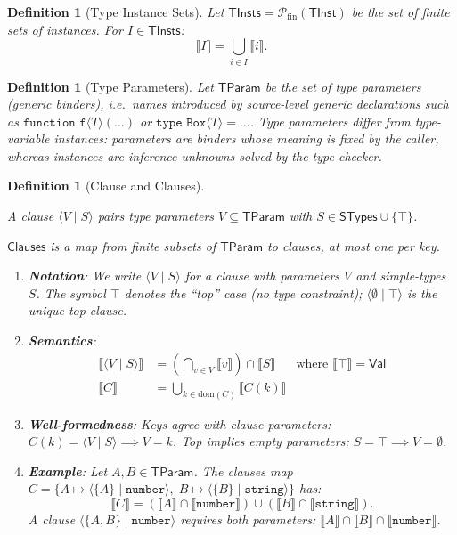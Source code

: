 \documentclass[11pt]{article}
\newtheorem{definition}[theorem]{Definition}
\newcommand{\sem}[1]{\llbracket #1 \rrbracket}
\newcommand{\Clauses}{\mathsf{Clauses}}
\newcommand{\STypes}{\mathsf{STypes}}
\newcommand{\TInst}{\mathsf{TInst}}
\newcommand{\TInsts}{\mathsf{TInsts}}
\newcommand{\TParam}{\mathsf{TParam}}
\newcommand{\Val}{\mathsf{Val}}
\newcommand{\clause}[2]{\langle #1 \mid #2 \rangle}
\begin{document}
\begin{definition}[Type Instance Sets]
\label{def:type-instance-sets}
Let $\TInsts = \mathcal{P}_{\mathrm{fin}}(\TInst)$ be the set of \emph{finite} sets of instances.
For $I \in \TInsts$:
\[
\sem{I} = \bigcup_{i \in I} \sem{i}.
\]
\end{definition}

\begin{definition}[Type Parameters]
\label{def:type-parameters}
Let $\TParam$ be the set of \emph{type parameters} (generic binders), i.e.\ names introduced by source-level generic declarations such as $\texttt{function f}\langle T\rangle(\ldots)$ or $\texttt{type Box}\langle T\rangle = \ldots$.
Type parameters differ from type-variable instances: parameters are binders whose meaning is fixed by the caller, whereas instances are inference unknowns solved by the type checker.
\end{definition}

\begin{definition}[Clause and Clauses]
\label{def:clause-clauses}
\leavevmode
\begin{keydef}
A \emph{clause} $\clause{V}{S}$ pairs type parameters $V \subseteq \TParam$ with $S \in \STypes \cup \{\top\}$.

\smallskip
$\Clauses$ is a map from finite subsets of $\TParam$ to clauses, at most one per key.
\end{keydef}

\begin{enumerate}
\item \textbf{Notation}: We write $\clause{V}{S}$ for a clause with parameters $V$ and simple-types $S$.
  The symbol $\top$ denotes the ``top'' case (no type constraint); $\clause{\emptyset}{\top}$ is the unique top clause.

\item \textbf{Semantics}:
\begin{align*}
\sem{\clause{V}{S}} &= \textstyle\left(\bigcap_{v \in V} \sem{v}\right) \cap \sem{S}
& \text{where } \sem{\top} = \Val \\
\sem{C} &= \textstyle\bigcup_{k \in \mathrm{dom}(C)} \sem{C(k)}
\end{align*}

\item \textbf{Well-formedness}: Keys agree with clause parameters: $C(k) = \clause{V}{S} \implies V = k$.
  Top implies empty parameters: $S = \top \implies V = \emptyset$.

\item \textbf{Example}: Let $A, B \in \TParam$.
  The clauses map $C = \{A \mapsto \clause{\{A\}}{\texttt{number}},\; B \mapsto \clause{\{B\}}{\texttt{string}}\}$ has:
\[
\sem{C} = (\sem{A} \cap \sem{\texttt{number}}) \cup (\sem{B} \cap \sem{\texttt{string}}).
\]
A clause $\clause{\{A,B\}}{\texttt{number}}$ requires \emph{both} parameters: $\sem{A} \cap \sem{B} \cap \sem{\texttt{number}}$.
\end{enumerate}
\end{definition}
\end{document}
